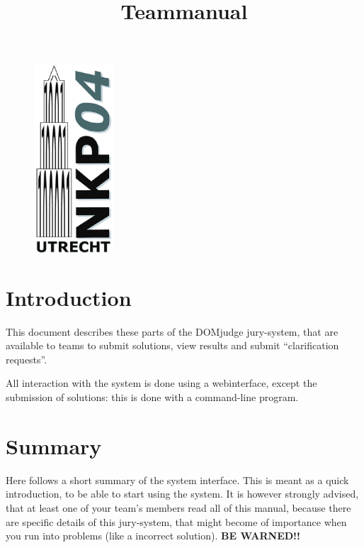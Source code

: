 \documentclass[11pt,a4paper]{article}
\title{Teammanual \DOMjudge}
\newcommand{\DOMjudge}{\textsc{DOM}judge }
\begin{document}
\begin{titlepage}

\maketitle

\vspace{1cm}

\begin{figure}[htbp]
\centerline{\includegraphics[height=7cm]{domjudgelogo.eps}}
\end{figure}

\end{titlepage}


\newpage
\tableofcontents

\newpage
\section{Introduction}

This document describes these parts of the \DOMjudge jury-system, that
are available to teams to submit solutions, view results and submit
``clarification requests''.

All interaction with the system is done using a webinterface, except
the submission of solutions: this is done with a command-line program.

\section{Summary}

Here follows a short summary of the system interface. This is meant as
a quick introduction, to be able to start using the system. It is
however strongly advised, that at least one of your team's members
read all of this manual, because there are specific details of this
jury-system, that might become of importance when you run into
problems (like a incorrect solution). \textbf{BE WARNED!!}
\end{document}
